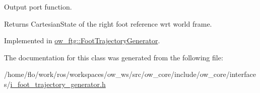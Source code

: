 Output port function. 

\begin{DoxyReturn}{Returns}
Cartesian\+State of the right foot reference wrt world frame. 
\end{DoxyReturn}


Implemented in \hyperlink{classow__ftg_1_1FootTrajectoryGenerator_a809340f159fba526fdcc8610bd698585}{ow\+\_\+ftg\+::\+Foot\+Trajectory\+Generator}.



The documentation for this class was generated from the following file\+:\begin{DoxyCompactItemize}
\item 
/home/flo/work/ros/workspaces/ow\+\_\+ws/src/ow\+\_\+core/include/ow\+\_\+core/interfaces/\hyperlink{i__foot__trajectory__generator_8h}{i\+\_\+foot\+\_\+trajectory\+\_\+generator.\+h}\end{DoxyCompactItemize}
